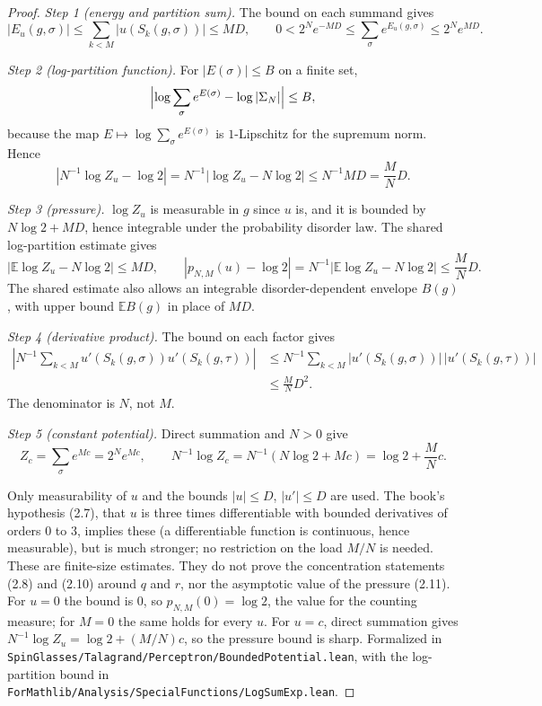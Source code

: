 \begin{proof}
  \leanok
\emph{Step 1 (energy and partition sum).} The bound on each summand gives
\[
 |E_u(g,\sigma)|\le\sum_{k<M}|u(S_k(g,\sigma))|\le MD,\qquad
 0<2^Ne^{-MD}\le\sum_\sigma e^{E_u(g,\sigma)}\le2^Ne^{MD}.
\]

\emph{Step 2 (log-partition function).} For $|E(\sigma)|\le B$ on a finite set,
\[
\Bigl|\log\sum_\sigma e^{E(\sigma)}-\log|\Sigma_N|\Bigr|\le B,
\]
because the map $E\mapsto\log\sum_\sigma e^{E(\sigma)}$ is $1$-Lipschitz for the supremum norm. Hence
\[
 \left|N^{-1}\log Z_u-\log2\right|
 =N^{-1}|\log Z_u-N\log2|\le N^{-1}MD=\frac MN D.
\]

\emph{Step 3 (pressure).} $\log Z_u$ is measurable in $g$ since $u$ is, and it is bounded by $N\log2+MD$, hence
integrable under the probability disorder law. The shared log-partition estimate gives
\[
 |\mathbb E\log Z_u-N\log2|\le MD,\qquad
 |p_{N,M}(u)-\log2|=N^{-1}|\mathbb E\log Z_u-N\log2|\le\frac MN D.
\]
The shared estimate also allows an integrable disorder-dependent envelope $B(g)$, with upper
bound $\mathbb E B(g)$ in place of $MD$.

\emph{Step 4 (derivative product).} The bound on each factor gives
\begin{align*}
 \left|N^{-1}\sum_{k<M}u'(S_k(g,\sigma))u'(S_k(g,\tau))\right|
 &\le N^{-1}\sum_{k<M}|u'(S_k(g,\sigma))|\,|u'(S_k(g,\tau))|\\
 &\le\frac MN D^2.
\end{align*}
The denominator is $N$, not $M$.

\emph{Step 5 (constant potential).} Direct summation and $N>0$ give
\[
 Z_c=\sum_\sigma e^{Mc}=2^Ne^{Mc},\qquad
 N^{-1}\log Z_c=N^{-1}(N\log2+Mc)=\log2+\frac MN c.
\]

Only measurability of $u$ and the bounds $|u|\le D$, $|u'|\le D$ are used. The book's hypothesis (2.7), that $u$ is
three times differentiable with bounded derivatives of orders $0$ to $3$, implies these (a differentiable function
is continuous, hence measurable), but is much stronger; no restriction on the load $M/N$ is needed. These are
finite-size estimates. They do not prove the concentration statements (2.8) and (2.10) around $q$ and $r$, nor
the asymptotic value of the pressure (2.11). For $u=0$ the bound is $0$, so $p_{N,M}(0)=\log2$, the value for the
counting measure; for $M=0$ the same holds for every $u$. For $u=c$, direct summation gives
$N^{-1}\log Z_u=\log2+(M/N)c$, so the pressure bound is sharp.
Formalized in \texttt{SpinGlasses/Talagrand/Perceptron/BoundedPotential.lean}, with the log-partition bound in
\texttt{ForMathlib/Analysis/SpecialFunctions/LogSumExp.lean}.
\end{proof}

